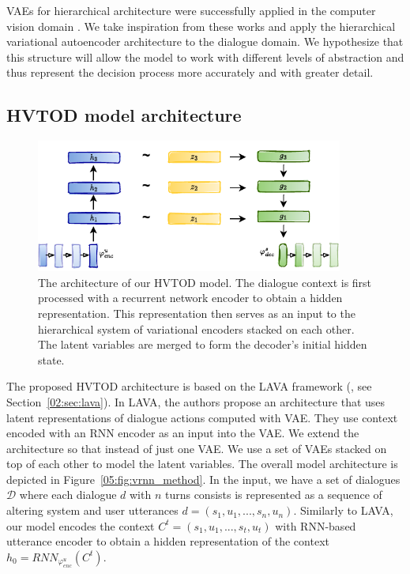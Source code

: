 VAEs for hierarchical architecture were successfully applied in the computer vision domain \cite{vahdat2020nvae,li2020progressive}.
We take inspiration from these works and apply the hierarchical variational autoencoder architecture to the dialogue domain.
We hypothesize that this structure will allow the model to work with different levels of abstraction and thus represent the decision process more accurately and with greater detail.

\subsection{HVTOD model architecture}
\begin{figure}[h]
    \centering
    \includegraphics[width=0.9\textwidth]{images/HVTOD-full-noN.pdf}
    \caption{The architecture of our HVTOD model. The dialogue context is first processed with a recurrent network encoder to obtain a hidden representation. This representation then serves as an input to the hierarchical system of variational encoders stacked on each other. The latent variables are merged to form the decoder's initial hidden state.}
    \label{05:fig:HVTOD-full}
\end{figure}
The proposed HVTOD architecture is based on the LAVA framework (\cite{lubis-etal-2022-dialogue}, see Section~\ref{02:sec:lava}).
In LAVA, the authors propose an architecture that uses latent representations of dialogue actions computed with VAE.
They use context encoded with an RNN encoder as an input into the VAE.
We extend the architecture so that instead of just one VAE.
We use a set of VAEs stacked on top of each other to model the latent variables.
The overall model architecture is depicted in Figure~\ref{05:fig:vrnn_method}.
In the input, we have a set of dialogues $\mathcal{D}$ where each dialogue $d$ with $n$ turns consists is represented as a sequence of altering system and user utterances $d = (s_1,u_1,...,s_n,u_n)$.
Similarly to LAVA, our model encodes the context $C^t = (s_1,u_1,...,s_t,u_t)$ with RNN-based utterance encoder to obtain a hidden representation of the context $h_0 = RNN_{\varphi_{enc}^u} (C^t)$.
